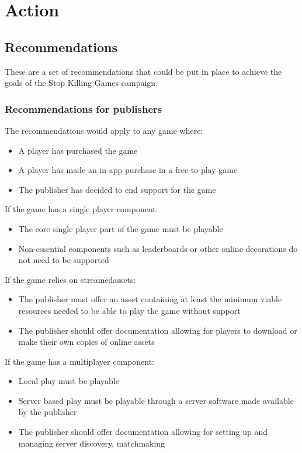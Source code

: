 \chapter{Action}

\section{Recommendations}
These are a set of recommendations that could be put in place to achieve the goals of the Stop Killing Games campaign.


\subsection{Recommendations for publishers}

The recommendations would apply to any game where:
\begin{itemize}
    \item A player has purchased the game
    \item A player has made an in-app purchase in a free-to-play game
    \item The publisher has decided to end support for the game
\end{itemize}

If the game has a single player component:
\begin{itemize}
    \item The core single player part of the game must be playable
    \item Non-essential components such as leaderboards or other online decorations do not need to be supported
\end{itemize}

If the game relies on \gls{streamedassets}:
\begin{itemize}
    \item The publisher must offer an \gls{asset} containing at least the minimum viable resources needed to be able to play the game without support
    \item The publisher should offer documentation allowing for players to download or make their own copies of online \glspl{asset}
\end{itemize}

If the game has a multiplayer component:
\begin{itemize}
    \item Local play must be playable
    \item Server based play must be playable through a server software made available by the publisher
    \item The publisher should offer documentation allowing for setting up and managing server discovery, \gls{matchmaking}
\end{itemize}

